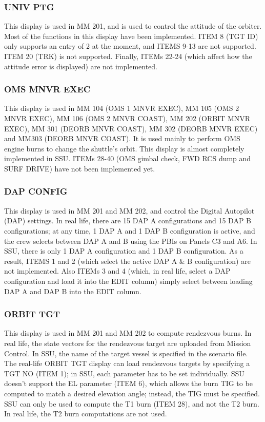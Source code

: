 \documentclass[Space_Shuttle_Ultra_Manual.tex]{subfiles}
\begin{document}
\begin{multicols*}{2}
\subsubsection{UNIV PTG}
This display is used in MM 201, and is used to control the attitude of the orbiter. Most of the functions in this display have been implemented. ITEM 8 (TGT ID) only supports an entry of 2 at the moment, and ITEMS 9-13 are not supported. ITEM 20 (TRK) is not supported. Finally, ITEMs 22-24 (which affect how the attitude error is displayed) are not implemented.

\subsubsection{OMS MNVR EXEC}
This display is used in MM 104 (OMS 1 MNVR EXEC), MM 105 (OMS 2 MNVR EXEC), MM 106 (OMS 2 MNVR COAST), MM 202 (ORBIT MNVR EXEC), MM 301 (DEORB MNVR COAST), MM 302 (DEORB MNVR EXEC) and MM303 (DEORB MNVR COAST). It is used mainly to perform OMS engine burns to change the shuttle's orbit.
This display is almost completely implemented in SSU. ITEMs 28-40 (OMS gimbal check, FWD RCS dump and SURF DRIVE) have not been implemented yet.

\subsubsection{DAP CONFIG}
This display is used in MM 201 and MM 202, and control the Digital Autopilot (DAP) settings. In real life, there are 15 DAP A configurations and 15 DAP B configurations; at any time, 1 DAP A and 1 DAP B configuration is active, and the crew selects between DAP A and B using the PBIs on Panels C3 and A6. In SSU, there is only 1 DAP A configuration and 1 DAP B configuration. As a result, ITEMS 1 and 2 (which select the active DAP A \& B configuration) are not implemented. Also ITEMs 3 and 4 (which, in real life, select a DAP configuration and load it into the EDIT column) simply select between loading DAP A and DAP B into the EDIT column.

\subsubsection{ORBIT TGT}
This display is used in MM 201 and MM 202 to compute rendezvous burns. In real life, the state vectors for the rendezvous target are uploaded from Mission Control. In SSU, the name of the target vessel is specified in the scenario file.
The real-life ORBIT TGT display can load rendezvous targets by specifying a TGT NO (ITEM 1); in SSU, each parameter has to be set individually. SSU doesn't support the EL parameter (ITEM 6), which allows the burn TIG to be computed to match a desired elevation angle; instead, the TIG must be specified.
SSU can only be used to compute the T1 burn (ITEM 28), and not the T2 burn. In real life, the T2 burn computations are not used.


\end{multicols*}
\end{document}
